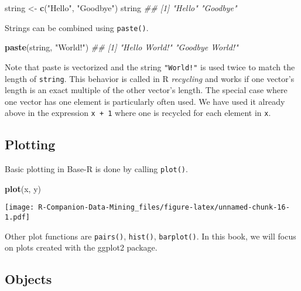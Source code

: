 \documentclass[
  notitlepage]{book}
\newenvironment{Shaded}{\begin{snugshade}}{\end{snugshade}}
\newcommand{\CommentTok}[1]{\textcolor[rgb]{0.56,0.35,0.01}{\textit{#1}}}
\newcommand{\KeywordTok}[1]{\textcolor[rgb]{0.13,0.29,0.53}{\textbf{#1}}}
\newcommand{\NormalTok}[1]{#1}
\newcommand{\StringTok}[1]{\textcolor[rgb]{0.31,0.60,0.02}{#1}}
\begin{document}
\begin{Shaded}
\begin{Highlighting}[]
\NormalTok{string \textless{}{-}}\StringTok{ }\KeywordTok{c}\NormalTok{(}\StringTok{"Hello"}\NormalTok{, }\StringTok{"Goodbye"}\NormalTok{)}
\NormalTok{string}
\CommentTok{\#\# [1] "Hello"   "Goodbye"}
\end{Highlighting}
\end{Shaded}

Strings can be combined using \texttt{paste()}.

\begin{Shaded}
\begin{Highlighting}[]
\KeywordTok{paste}\NormalTok{(string, }\StringTok{"World!"}\NormalTok{)}
\CommentTok{\#\# [1] "Hello World!"   "Goodbye World!"}
\end{Highlighting}
\end{Shaded}

Note that paste is vectorized and the string \texttt{"World!"} is used twice to
match the length of \texttt{string}. This behavior is called in R \emph{recycling}
and works if one vector's length is an exact multiple of the other
vector's length. The special case where one vector has one element is
particularly often used. We have used it already above in the expression
\texttt{x\ +\ 1} where one is recycled for each element in \texttt{x}.

\hypertarget{plotting}{%
\subsection{Plotting}\label{plotting}}

Basic plotting in Base-R is done by calling \texttt{plot()}.

\begin{Shaded}
\begin{Highlighting}[]
\KeywordTok{plot}\NormalTok{(x, y)}
\end{Highlighting}
\end{Shaded}

\texttt{[image: R-Companion-Data-Mining\_files/figure-latex/unnamed-chunk-16-1.pdf]}

Other plot functions are \texttt{pairs()}, \texttt{hist()}, \texttt{barplot()}. In this book,
we will focus on plots created with the ggplot2 package.

\hypertarget{objects}{%
\subsection{Objects}\label{objects}}
\end{document}
